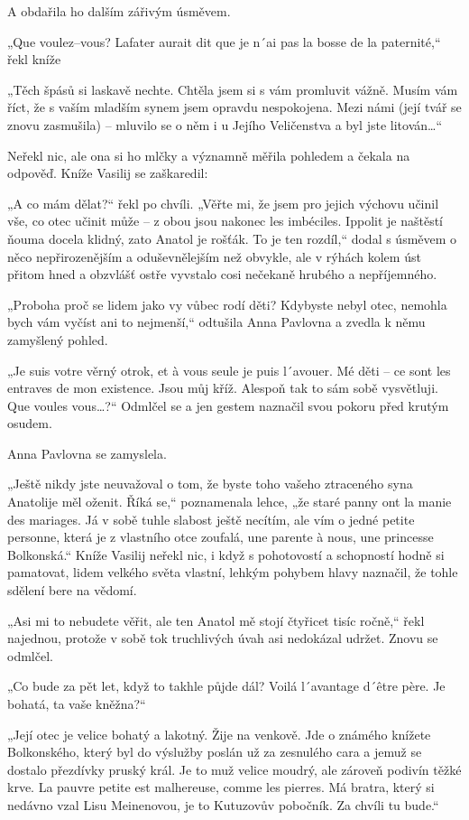 A obdařila ho dalším zářivým úsměvem.

„Que voulez–vous? Lafater aurait dit que je n´ai pas la bosse de la paternité,“ řekl kníže

„Těch špásů si laskavě nechte. Chtěla jsem si s vám promluvit vážně. Musím vám říct, že s vaším mladším synem jsem opravdu nespokojena. Mezi námi (její tvář se znovu zasmušila) – mluvilo se o něm i u Jejího Veličenstva a byl jste litován…“

Neřekl nic, ale ona si ho mlčky a významně měřila pohledem a čekala na odpověď. Kníže Vasilij se zaškaredil:

„A co mám dělat?“ řekl po chvíli. „Věřte mi, že jsem pro jejich výchovu učinil vše, co otec učinit může – z obou jsou nakonec les imbéciles. Ippolit je naštěstí ňouma docela klidný, zato Anatol je rošťák. To je ten rozdíl,“ dodal s úsměvem o něco nepřirozenějším a oduševnělejším než obvykle, ale v rýhách kolem úst přitom hned a obzvlášť ostře vyvstalo cosi nečekaně hrubého a nepříjemného.

„Proboha proč se lidem jako vy vůbec rodí děti? Kdybyste nebyl otec, nemohla bych vám vyčíst ani to nejmenší,“ odtušila Anna Pavlovna a zvedla k němu zamyšlený pohled.

„Je suis votre věrný otrok, et à vous seule je puis l´avouer. Mé děti – ce sont les entraves de mon existence. Jsou můj kříž. Alespoň tak to sám sobě vysvětluji. Que voules vous…?“ Odmlčel se a jen gestem naznačil svou pokoru před krutým osudem.

Anna Pavlovna se zamyslela.

„Ještě nikdy jste neuvažoval o tom, že byste toho vašeho ztraceného syna Anatolije měl oženit. Říká se,“ poznamenala lehce, „že staré panny ont la manie des mariages. Já v sobě tuhle slabost ještě necítím, ale vím o jedné petite personne, která je z vlastního otce zoufalá, une parente à nous, une princesse Bolkonská.“ Kníže Vasilij neřekl nic, i když s pohotovostí a schopností hodně si pamatovat, lidem velkého světa vlastní, lehkým pohybem hlavy naznačil, že tohle sdělení bere na vědomí.

„Asi mi to nebudete věřit, ale ten Anatol mě stojí čtyřicet tisíc ročně,“ řekl najednou, protože v sobě tok truchlivých úvah asi nedokázal udržet. Znovu se odmlčel.

„Co bude za pět let, když to takhle půjde dál? Voilá l´avantage d´être père. Je bohatá, ta vaše kněžna?“

„Její otec je velice bohatý a lakotný. Žije na venkově. Jde o známého knížete Bolkonského, který byl do výslužby poslán už za zesnulého cara a jemuž se dostalo přezdívky pruský král. Je to muž velice moudrý, ale zároveň podivín těžké krve. La pauvre petite est malhereuse, comme les pierres. Má bratra, který si nedávno vzal Lisu Meinenovou, je to Kutuzovův pobočník. Za chvíli tu bude.“

